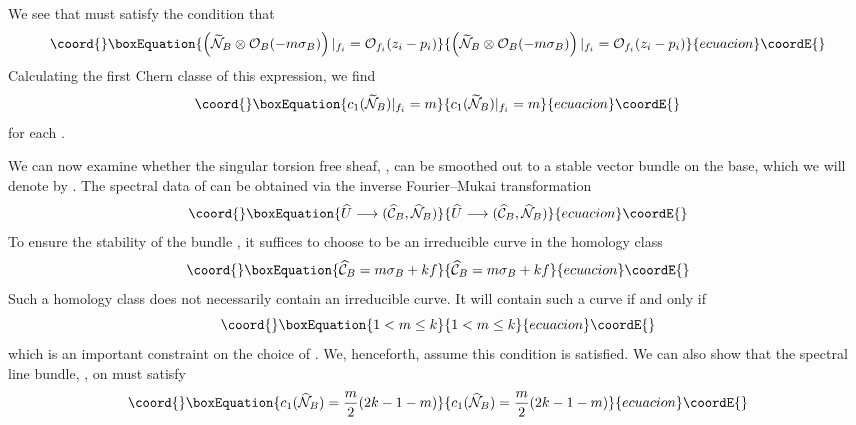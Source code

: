 \documentclass[a4paper,12pt]{article}
\numberwithin{equation}{section}
\def\cC{{\mathcal C}}
\def\cN{{\mathcal N}}
\def\cO{{\mathcal O}}
\theoremstyle{plain}
\begin{document}
We see that \myHighlight{$\widetilde{\cN}_{B}$}\coordHE{} must satisfy the condition that
\begin{equation}\coord{}\boxEquation{
\left(\widetilde{\cN}_{B}\otimes
\cO_{B}(-m\sigma_{B})\right)|_{f_{i}}=  \cO_{f_{i}}(z_{i}-p_{i})
\label{eq:159}
}{
\left(\widetilde{\cN}_{B}\otimes
\cO_{B}(-m\sigma_{B})\right)|_{f_{i}}=  \cO_{f_{i}}(z_{i}-p_{i})
}{ecuacion}\coordE{}\end{equation}
Calculating the first Chern classe of this expression, we find 
\begin{equation}\coord{}\boxEquation{ 
c_{1}(\widetilde{\cN}_{B})|_{f_{i}}=m
\label{eq:161}
}{ 
c_{1}(\widetilde{\cN}_{B})|_{f_{i}}=m
}{ecuacion}\coordE{}\end{equation}
for each \coordHE{}.
 
We can now examine whether the singular torsion free sheaf,  
\coordHE{}, can
be smoothed out to a stable \coordHE{} vector bundle on the base, which we
will denote by \coordHE{}. The spectral data of \coordHE{} 
can be obtained via
the inverse Fourier--Mukai transformation
\begin{equation}\coord{}\boxEquation{
\widehat{U} \longrightarrow (\widehat{\cC}_{B}, \widehat{\cN}_{B})
\label{eq:162}
}{
\widehat{U} \longrightarrow (\widehat{\cC}_{B}, \widehat{\cN}_{B})
}{ecuacion}\coordE{}\end{equation}
To ensure the stability of 
the bundle \coordHE{}, it suffices to choose \myHighlight{$\widehat{\cC}_{B}$}\coordHE{} 
to be an
irreducible curve in the homology class
\begin{equation}\coord{}\boxEquation{
\widehat{\cC}_{B}= m\sigma_{B}+ kf
\label{eq:163}
}{
\widehat{\cC}_{B}= m\sigma_{B}+ kf
}{ecuacion}\coordE{}\end{equation}
Such a homology class does not necessarily contain an 
irreducible curve. It will contain such a curve if
and only if
\begin{equation}\coord{}\boxEquation{
1 < m \leq k
\label{eq:164}
}{
1 < m \leq k
}{ecuacion}\coordE{}\end{equation}
which is an important constraint on the choice of \coordHE{}. We, henceforth, assume
this condition is satisfied.
We can also show that the spectral line bundle, 
\myHighlight{$\widehat{\cN}_{B}$}\coordHE{}, on \myHighlight{$\widehat{\cC}$}\coordHE{} must satisfy
\begin{equation}\coord{}\boxEquation{
c_{1}(\widehat{\cN}_{B})= \frac{m}{2}(2k -1 -m)
\label{eq:165}
}{
c_{1}(\widehat{\cN}_{B})= \frac{m}{2}(2k -1 -m)
}{ecuacion}\coordE{}\end{equation}
\end{document}
